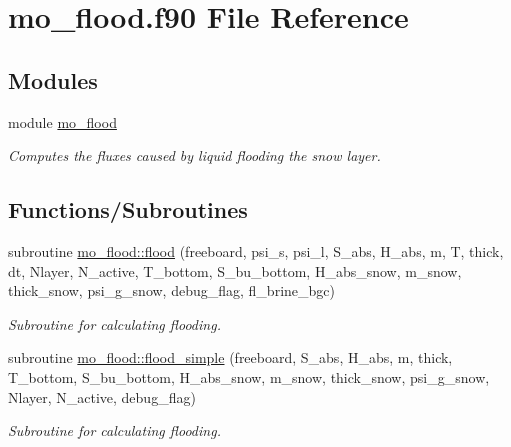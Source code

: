 \hypertarget{mo__flood_8f90}{
\section{mo\_\-flood.f90 File Reference}
\label{mo__flood_8f90}
}
\subsection*{Modules}
\begin{DoxyCompactItemize}
\item 
module \hyperlink{namespacemo__flood}{mo\_\-flood}


\begin{DoxyCompactList}\small\item\em Computes the fluxes caused by liquid flooding the snow layer. \item\end{DoxyCompactList}

\end{DoxyCompactItemize}
\subsection*{Functions/Subroutines}
\begin{DoxyCompactItemize}
\item 
subroutine \hyperlink{namespacemo__flood_afd760054790f70911ffe84a82e402840}{mo\_\-flood::flood} (freeboard, psi\_\-s, psi\_\-l, S\_\-abs, H\_\-abs, m, T, thick, dt, Nlayer, N\_\-active, T\_\-bottom, S\_\-bu\_\-bottom, H\_\-abs\_\-snow, m\_\-snow, thick\_\-snow, psi\_\-g\_\-snow, debug\_\-flag, fl\_\-brine\_\-bgc)
\begin{DoxyCompactList}\small\item\em Subroutine for calculating flooding. \item\end{DoxyCompactList}\item 
subroutine \hyperlink{namespacemo__flood_ac2e89f500f5c985c74a9521783ca4bce}{mo\_\-flood::flood\_\-simple} (freeboard, S\_\-abs, H\_\-abs, m, thick, T\_\-bottom, S\_\-bu\_\-bottom, H\_\-abs\_\-snow, m\_\-snow, thick\_\-snow, psi\_\-g\_\-snow, Nlayer, N\_\-active, debug\_\-flag)
\begin{DoxyCompactList}\small\item\em Subroutine for calculating flooding. \item\end{DoxyCompactList}\end{DoxyCompactItemize}
